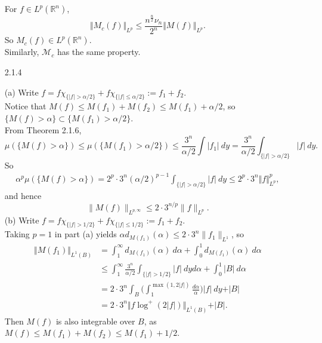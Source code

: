 \begin{itemize}
For $f\in L^p(\mathbb{R}^n)$,
$$\Vert M_c(f)\Vert_{L^p}\leq \frac{n^{\frac n2}\nu_n}{2^n}\Vert M(f)\Vert_{L^p}.$$
So $M_c(f)\in L^p(\mathbb{R}^n)$.\\
Similarly, $\mathcal{M}_c$ has the same property.

\item[2.1.4]

(a) Write $f=f\chi_{\{\vert f\vert>\alpha/2\}}+f\chi_{\{\vert f\vert\leq\alpha/2\}}:=f_1+f_2$.
\\Notice that $M(f)\leq M(f_1)+M(f_2)\leq M(f_1)+\alpha/2$, so $\{M(f)>\alpha\}\subset \{M(f_1)>\alpha/2\}$.\\
From Theorem 2.1.6, $$\mu(\{M(f)>\alpha\})\leq\mu(\{M(f_1)>\alpha/2\})
\leq \frac{3^n}{\alpha/2}\int \vert f_1\vert\>dy
=\frac{3^n}{\alpha/2}\int_{\{\vert f\vert>\alpha/2\}}\vert f\vert\>dy.$$
So 
\begin{align*}
\alpha^p\mu(\{M(f)>\alpha\})
=2^p\cdot3^n(\alpha/2)^{p-1}\int_{\{\vert f\vert>\alpha/2\}}\vert f\vert\>dy
\leq 2^p\cdot3^n\Vert f\Vert_{L^p}^p,
\end{align*}
and hence
$$\|M(f)\|_{L^{p,\infty}}\leq2\cdot3^{n/p}\|f\|_{L^p}.$$
(b) Write $f=f\chi_{\{\vert f\vert>1/2\}}+f\chi_{\{\vert f\vert\leq1/2\}}:=f_1+f_2$.
\\Taking $p=1$ in part (a) yields 
$\alpha d_{M(f_1)}(\alpha)\leq2\cdot3^n\|f_1\|_{L^1}$, so
\begin{align*}
\Vert M(f_1)\Vert_{L^1(B)}&=\int_1^{\infty}d_{M(f_1)}(\alpha)\>d\alpha+\int_0^1 d_{M(f_1)}(\alpha)\>d\alpha\\
&\leq \int_1^{\infty}\frac{3^n}{\alpha/2}\int_{\{\vert f\vert>1/2\}}\vert f\vert\>dyd\alpha+\int_0^1 \vert B\vert\>d\alpha\\
&=2\cdot3^n\int_B\bigg(\int_1^{\max(1,2\vert f\vert)}\frac{d\alpha}{\alpha}\bigg)\vert f\vert\>dy+\vert B\vert\\
&=2\cdot 3^n\Vert f\log^+(2\vert f\vert)\Vert_{L^1(B)}+\vert B\vert.
\end{align*}
Then $M(f)$ is also integrable over $B$, as $M(f)\leq M(f_1)+M(f_2)\leq M(f_1)+1/2$.


\end{itemize}
